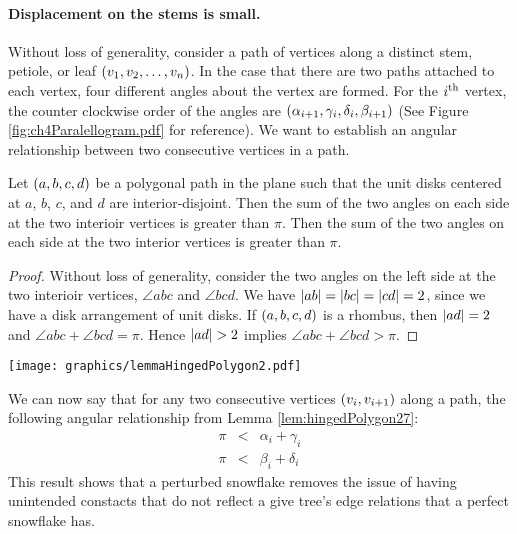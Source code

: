 \paragraph{Displacement on the stems is small.}
Without loss of generality, consider a path of vertices along a distinct stem, petiole, or leaf $\left( v_1, v_2, \ldots, v_n \right)$.  
In the case that there are two paths attached to each vertex, four different angles about the vertex are formed.  
For the $i^\text{th}$ vertex, the counter clockwise order of the angles are $\left( \alpha_{i+1}, \gamma_i, \delta_i, \beta_{i+1} \right)$ (See Figure \ref{fig:ch4Paralellogram.pdf} for reference).  
We want to establish an angular relationship between two consecutive vertices in a path.
\begin{lem}\label{lem:hingedPolygon27}
Let $\left( a,b,c,d \right)$ be a polygonal path in the plane such that the unit disks centered at $a$, $b$, $c$, and $d$ are interior-disjoint.  Then the sum of the two angles on each side at the two interioir vertices is greater than $\pi$. Then the sum of the two angles on each side at the two interior vertices is greater than $\pi$.
\end{lem}
\begin{proof}
Without loss of generality, consider the two angles on the left side  at the two interioir vertices, $\angle abc$ and $\angle bcd$.  We have $\left\vert ab \right\vert = \left\vert bc \right\vert = \left\vert cd \right\vert = 2$, since we have a disk arrangement of unit disks.  If $\left( a,b,c,d \right)$ is a rhombus, then $\left\vert ad \right\vert=2$ and $\angle abc + \angle bcd = \pi$.  Hence $\left\vert ad \right\vert>2$ implies $\angle abc + \angle bcd > \pi$. 
\end{proof}

\begin{minipage}{\linewidth}
\begin{center}
\texttt{[image: graphics/lemmaHingedPolygon2.pdf]}
\label{fig:lemmaHingedPolygon2.pdf}
\end{center}
\end{minipage}

We can now say that for any two consecutive vertices $\left( v_i, v_{i+1} \right)$ along a path, the following angular relationship from Lemma \ref{lem:hingedPolygon27}:
$$ 
\begin{array}{rcl}
\pi &<& \alpha_i + \gamma_i \\
\pi &<& \beta_i + \delta_i
\end{array}
$$
This result shows that a perturbed snowflake removes the issue of having unintended constacts that do not reflect a give tree's edge relations that a perfect snowflake has.  

